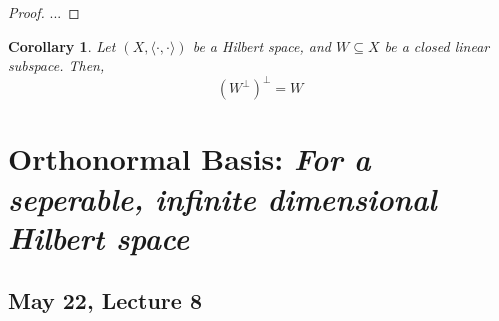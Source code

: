 \documentclass[11pt]{amsart}
\newtheorem{corollary}[theorem]{Corollary}
\theoremstyle{definition}
\numberwithin{equation}{section}
\newcommand{\ips}{ \left( X, \langle \cdot, \cdot \rangle \right) }		%
\begin{document}
\begin{proof} ...
\end{proof}

\begin{corollary}\label{cor:310}
Let $\ips$ be a Hilbert space, and $W \subseteq X$ be a closed linear subspace. Then, 
\[ \left( W^\perp \right)^\perp = W \]
\end{corollary}

\section{Orthonormal Basis: \textit{For a seperable, infinite dimensional Hilbert space}}

\subsection{May 22, Lecture 8}
\end{document}
